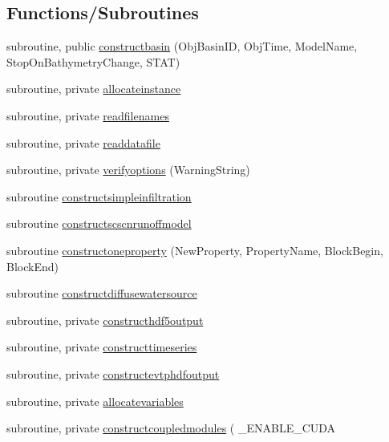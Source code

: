 \subsection*{Functions/\+Subroutines}
\begin{DoxyCompactItemize}
\item 
subroutine, public \mbox{\hyperlink{namespacemodulebasin_a51d97ade316802f4f499db0fb3835e3f}{constructbasin}} (Obj\+Basin\+ID, Obj\+Time, Model\+Name, Stop\+On\+Bathymetry\+Change, S\+T\+AT)
\item 
subroutine, private \mbox{\hyperlink{namespacemodulebasin_a59f6b3609f5cf292bc0d40591c8d6d33}{allocateinstance}}
\item 
subroutine, private \mbox{\hyperlink{namespacemodulebasin_a78bcec6c944663f5c555c4799011fd8f}{readfilenames}}
\item 
subroutine, private \mbox{\hyperlink{namespacemodulebasin_af9f507847046c6d52d84d57c39911669}{readdatafile}}
\item 
subroutine, private \mbox{\hyperlink{namespacemodulebasin_a6de1170114b38ad6db725fe89c8cd2bd}{verifyoptions}} (Warning\+String)
\item 
subroutine \mbox{\hyperlink{namespacemodulebasin_a0b7274cf3bbde399251125f839f59767}{constructsimpleinfiltration}}
\item 
subroutine \mbox{\hyperlink{namespacemodulebasin_a5a5342d9e5be44e9161d8d4643071661}{constructscscnrunoffmodel}}
\item 
subroutine \mbox{\hyperlink{namespacemodulebasin_a5a3aa456544a0c67f38a3d3655071347}{constructoneproperty}} (New\+Property, Property\+Name, Block\+Begin, Block\+End)
\item 
subroutine \mbox{\hyperlink{namespacemodulebasin_a3d6f3d514121b3b20c1b2d2ec4c56fa9}{constructdiffusewatersource}}
\item 
subroutine, private \mbox{\hyperlink{namespacemodulebasin_ad767dee07579ea3a5545d747a0d7cfcf}{constructhdf5output}}
\item 
subroutine, private \mbox{\hyperlink{namespacemodulebasin_a485c76ff915dee4b9ba1ca5c7e79d462}{constructtimeseries}}
\item 
subroutine, private \mbox{\hyperlink{namespacemodulebasin_abec73ddab1c13a2f52007dbd7a5adf56}{constructevtphdfoutput}}
\item 
subroutine, private \mbox{\hyperlink{namespacemodulebasin_a86eb7d3c4f70fdc55c9b4a4945a8ad9b}{allocatevariables}}
\item 
subroutine, private \mbox{\hyperlink{namespacemodulebasin_a3b96c67f2670be0a100bc48d94ecb93d}{constructcoupledmodules}} ( \+\_\+\+E\+N\+A\+B\+L\+E\+\_\+\+C\+U\+DA

\end{DoxyCompactItemize}
